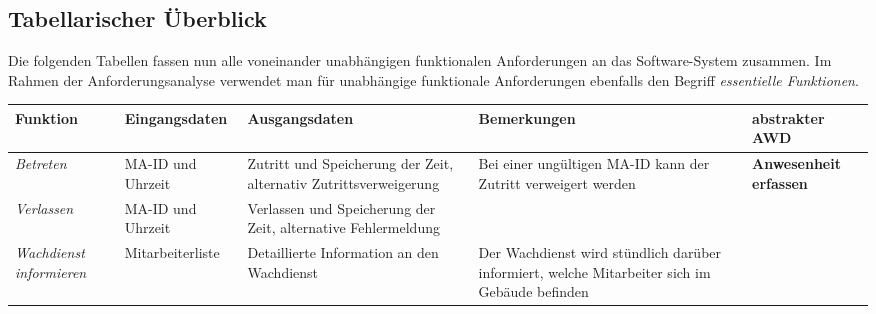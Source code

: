 \subsection{Tabellarischer \"Uberblick}
Die folgenden Tabellen fassen nun alle voneinander unabh\"angigen funktionalen Anforderungen an das Software-System zusammen.  Im Rahmen der Anforderungsanalyse verwendet man f\"ur unabh\"angige funktionale Anforderungen ebenfalls den Begriff  \textit{essentielle Funktionen}.

{
\vspace{1cm}
\hspace{-3,5cm}
\footnotesize
\begin{tabular}{|p{3cm}|p{4cm}|p{4cm}|p{4cm}|p{2cm}|}
	\hline
		\textbf{Funktion	} &	
		\textbf{Eingangsdaten} &
		\textbf{Ausgangsdaten}& 
		\textbf{Bemerkungen}	&
		\textbf{abstrakter AWD} \\
	\hline \hline 
		\textit{Betreten} &
		MA-ID und Uhrzeit &
		Zutritt und Speicherung der Zeit, alternativ Zutrittsverweigerung & 
		Bei einer ung\"ultigen MA-ID kann der Zutritt verweigert werden &  
		\textbf{Anwesenheit erfassen} \\
	\cline{1-4}
		\textit{Verlassen} & 
		MA-ID und Uhrzeit & 
		Verlassen und Speicherung der Zeit, alternative Fehlermeldung &
		& 
		\\
	\cline{1-4}
		\textit{Wachdienst \mbox{informieren}} &
		Mitarbeiterliste &
		Detaillierte Information an den Wachdienst &
		Der Wachdienst wird st\"undlich dar\"uber informiert, welche Mitarbeiter sich im Geb\"aude befinden &
		\\
	\hline
\end{tabular}
}

